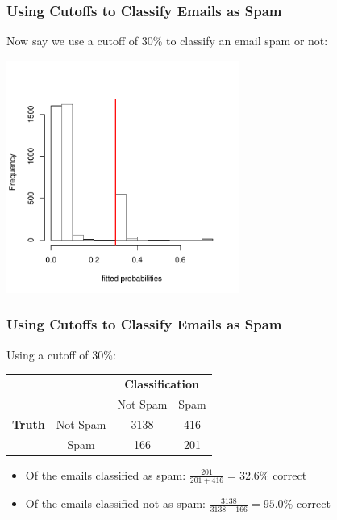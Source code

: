 \documentclass[handout]{beamer}
\newcommand{\blue}[1]{\textcolor{blue2}{#1}}
\begin{document}
\begin{frame}[fragile]
\frametitle{Using Cutoffs to Classify Emails as Spam}

Now say we use a cutoff of 30\% to \blue{classify} an email spam or not:
\begin{center}
\includegraphics[width=3in]{figure/fitted3.pdf}
\end{center}

\end{frame}


\begin{frame}[fragile]
\frametitle{Using Cutoffs to Classify Emails as Spam}

Using a cutoff of 30\%:
\begin{center}
  \begin{tabular}{cc|cc}
     \multicolumn{2}{c}{}  & \multicolumn{2}{c}{\textbf{Classification}} \\ 
     &  & Not Spam & Spam \\ 
\hline
    \textbf{Truth} & Not Spam & 3138 & 416\\
     & Spam & 166 & 201\\ 
    \hline
  \end{tabular}
\end{center}
\pause
\begin{itemize}
\item Of the emails classified as spam:  $\frac{201}{201+416} = 32.6\%$ correct
\item Of the emails classified not as spam:  $\frac{3138}{3138+166} = 95.0\%$ correct
\end{itemize}

\end{frame}
\end{document}
